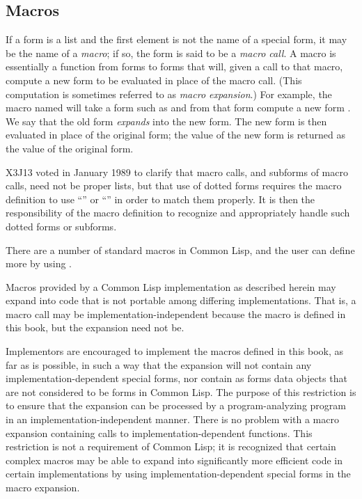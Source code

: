 \subsection{Macros}

If a form is a list and the first element is not the name of a special
form, it may be the name of a {\it macro}; if so, the form is said
to be a {\it macro call}.  A macro is essentially a function from
forms to forms that will, given a call to that macro, compute
a new form to be evaluated in place of the macro call.
(This computation is sometimes referred to as {\it macro expansion}.)
For example, the macro named  will take a form such as
 and from that form compute a new form
.  We say that the old
form {\it expands} into the new form.  The new form is then evaluated in
place of the original form; the value of the new form is returned as the
value of the original form.

\begin{new}
X3J13 voted in January 1989
to clarify that macro calls, and subforms
of macro calls, need not be proper lists, but that use of dotted forms
requires the macro definition to use ``'' or
``'' in order to match them properly.
It is then the responsibility of the macro definition to recognize
and appropriately handle such dotted forms or subforms.
\end{new}

There are a number of standard macros in Common Lisp, and the user can define more
by using .

Macros provided by a Common Lisp implementation as described herein may expand
into code that is not portable among differing implementations.
That is, a macro call may be implementation-independent because
the macro is defined in this book, but the expansion need not be.

\beforenoterule
\begin{implementation}
Implementors are encouraged to implement the macros
defined in this book, as far as is possible, in such a way that
the expansion will not contain any implementation-dependent
special forms, nor contain as forms data objects that
are not considered to be forms in Common Lisp.
The purpose of this restriction is to ensure that the expansion
can be processed by a program-analyzing program in an
implementation-independent manner.
There is no problem with a macro expansion containing
calls to implementation-dependent functions.
This restriction is not a requirement of Common Lisp; it is recognized
that certain complex macros may be able to expand into significantly
more efficient code in certain implementations
by using implementation-dependent special forms in the macro expansion.
\end{implementation}
\afternoterule

